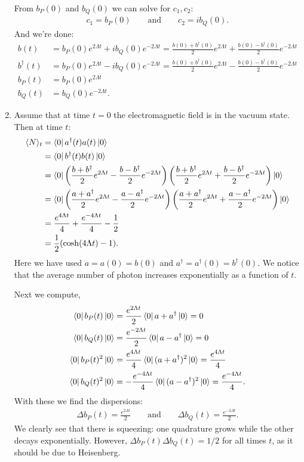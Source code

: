 \documentclass{article}
\theoremstyle{definition}
\newcommand{\f}[2]{\frac{#1}{#2}}
\newcommand{\lp}{\left(}
\newcommand{\rp}{\right)}
\begin{document}
\begin{enumerate}[label=(\alph*)]
From $b_P(0)$ and $b_Q(0)$ we can solve for $c_1, c_2$:
\begin{align*}
c_1 =  b_P(0) \quad\quad \text{and} \quad\quad c_2 = ib_Q(0).
\end{align*}
And we're done:
\begin{align*}
b(t) &= b_P(0) e^{2\Lambda t} + ib_Q(0) e^{-2\Lambda t} 
= \f{b(0) + b^\dagger(0)}{2} e^{2\Lambda t} + \f{b(0) - b^\dagger(0)}{2} e^{-2\Lambda t} \\ 
b^\dagger(t) &= b_P(0) e^{2\Lambda t} - ib_Q(0) e^{-2\Lambda t} 
= \f{b(0) + b^\dagger(0)}{2} e^{2\Lambda t} - \f{b(0) - b^\dagger(0)}{2} e^{-2\Lambda t} \\ 
b_P(t) &= b_P(0)  e^{2\Lambda t}   \\
b_Q(t) &= b_Q(0) e^{-2\Lambda t}.
\end{align*}


\item Assume that at time $t=0$ the electromagnetic field is in the vacuum state. Then at time $t$:
\begin{align*}
\langle N \rangle_t 
&= \bra{0}  a^\dagger(t) a(t) \ket{0} \\
&= \bra{0}  b^\dagger(t) b(t) \ket{0} \\
&= \bra{0} \lp  \f{b +b^\dagger}{2} e^{2\Lambda t} - \f{b -b^\dagger}{2} e^{-2\Lambda t} \rp 
 \lp  \f{b +b^\dagger}{2} e^{2\Lambda t} + \f{b -b^\dagger}{2} e^{-2\Lambda t} \rp \ket{0} \\
 &= \bra{0} \lp  \f{a +a^\dagger}{2} e^{2\Lambda t} - \f{a -a^\dagger}{2} e^{-2\Lambda t} \rp 
 \lp  \f{a +a^\dagger}{2} e^{2\Lambda t} + \f{a -a^\dagger}{2} e^{-2\Lambda t} \rp \ket{0} \\ 
 &= \f{e^{4\Lambda t}}{4} + \f{e^{-4\Lambda t}}{4} - \f{1}{2} \\
 &= \f{1}{2}( \cosh(4\Lambda t) - 1 ).
\end{align*}
Here we have used $a = a(0) = b(0)$ and $a^\dagger = a^\dagger(0) = b^\dagger(0)$.  We notice that the average number of photon increases exponentially as a function of $t$. 


Next we compute,
\begin{align*}
\bra{0}  b_P(t)   \ket{0} 
&= \f{e^{2\Lambda t}}{2} \bra{0} a + a^\dagger  \ket{0} = 0 \\
\bra{0} b_Q(t) \ket{0} 
&= \f{e^{-2\Lambda t}}{2} \bra{0}   a - a^\dagger \ket{0} = 0\\
\bra{0}   b_P(t)^2  \ket{0} 
&=  \f{e^{4\Lambda t}}{4} \bra{0} (a + a^\dagger)^2 \ket{0} = \f{e^{4\Lambda t}}{4} \\ 
\bra{0} b_Q(t)^2 \ket{0}
&= -\f{e^{-4\Lambda t}}{4} \bra{0} (a - a^\dagger)^2 \ket{0} = \f{e^{-4\Lambda t}}{4}.
\end{align*}
With these we find the dispersions:
\begin{align*}
\Delta b_P(t) = \f{e^{2\Lambda t}}{2} \quad\quad \text{and} \quad\quad \Delta b_Q(t) = \f{e^{-2\Lambda t}}{2}.
\end{align*}
We clearly see that there is squeezing: one quadrature grows while the other decays exponentially. However, $\Delta b_P(t) \Delta b_Q(t) = 1/2$ for all times $t$, as it should be due to Heisenberg. 





\end{enumerate}
\end{document}
